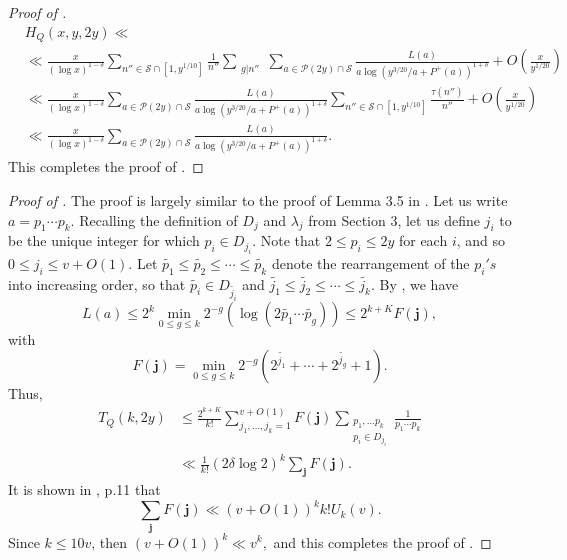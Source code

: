 \documentclass{amsart}
\theoremstyle{definition}
\numberwithin{equation}{section}
\renewcommand{\S}{\mathcal{S}}
\newcommand{\density}{\delta}
\begin{document}
\begin{proof}[Proof of ]
		\begin{align*}
			&H_Q(x,y,2y) \ll \\ &\ll \frac{x}{(\log x)^{1-\density}}\sum_{n'' \in \S \cap [1, y^{1/10}]}\frac{1}{n''} \sum_{\substack{g|n''}}\sum_{a \in \mathscr{P}(2y) \cap \S}\frac{L(a)}{a \log(y^{3/20}/a+P^+(a) )^{1+\density}} +O\left(\frac{x}{y^{1/20}}\right)\\
			&\ll \frac{x}{(\log x)^{1-\density}}\sum_{a \in \mathscr{P}(2y) \cap \S}\frac{L(a)}{a \log(y^{3/20}/a+P^+(a) )^{1+\density}} \sum_{n'' \in \S \cap [1, y^{1/10}]}\frac{\tau(n'')}{n''} +O\left(\frac{x}{y^{1/20}}\right)\\
			&\ll \frac{x}{(\log x)^{1-\density}}\sum_{a \in \mathscr{P}(2y) \cap \S}\frac{L(a)}{a \log(y^{3/20}/a+P^+(a) )^{1+\density}}.
		\end{align*}
		This completes the proof of .\end{proof}
		\begin{proof}[Proof of ]
			The proof is largely similar to the proof of Lemma 3.5 in \cite{ford2006integers}. Let us write $a =p_1 \cdots p_k$. Recalling the definition of $D_j$ and $\lambda_j$ from Section 3, let us define $j_i$ to be the unique integer for which $p_i \in D_{j_i}$. Note that $2 \leq p_i \leq 2y$ for each $i$, and so $0 \leq j_i \leq v +O(1).$ Let $\tilde{p_1} \leq \tilde{p_2} \leq \cdots \leq \tilde{p_k}$ denote the rearrangement of the $p_i's$ into increasing order, so that $\tilde{p_i} \in D_{\tilde{j_i}}$ and $\tilde{j_1} \leq \tilde{j_2} \leq \cdots \leq \tilde{j_k}$. By , we have 
			$$L(a) \leq 2^k \min_{0 \leq g \leq k}2^{-g}(\log(2\tilde{p_1}\cdots \tilde{p_g})) \leq 2^{k+K}F(\bm{j}),$$
			with $$F(\bm{j}) = \min_{0 \leq g \leq k}2^{-g}(2^{\tilde{j_1}} + \cdots + 2^{\tilde{j_g}} + 1).$$
			Thus,
			\begin{align*}
				T_Q(k,2y) &\leq \frac{2^{k+K}}{k!} \sum_{j_1,\dots, j_k = 1}^{v+O(1)}F(\bm{j}) \sum_{\substack{p_1, \dots p_k \\ p_i \in D_{j_i}}}\frac{1}{p_1 \cdots p_k}\\
				&\ll \frac{1}{k!}(2\density \log 2)^k \sum_{\bm{j}} F(\bm{j}).
			\end{align*}
			It is shown in \cite{ford2006integers}, p.11 that 
			$$\sum_{\bm{j}} F(\bm{j}) \ll (v+O(1))^k k! U_k(v).$$
			Since $k \leq 10v$, then $(v+O(1))^k \ll v^k,$ and this completes the proof of . \end{proof}
		\newpage
\end{document}

